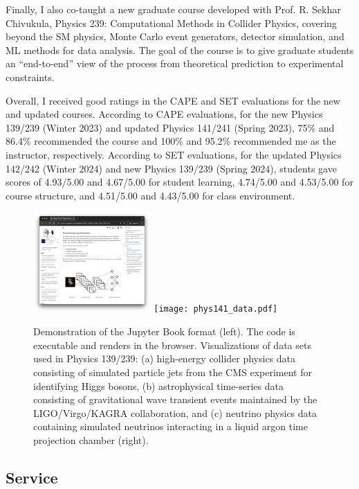 \documentclass[11pt,letterpaper,notitlepage]{article}
\begin{document}
Finally, I also co-taught a new graduate course developed with Prof. R. Sekhar Chivukula, Physics 239: Computational Methods in Collider Physics, covering beyond the SM physics, Monte Carlo event generators, detector simulation, and ML methods for data analysis.
The goal of the course is to give graduate students an ``end-to-end'' view of the process from theoretical prediction to experimental constraints.


Overall, I received good ratings in the CAPE and SET evaluations for the new and updated courses.
According to CAPE evaluations, for the new Physics 139/239 (Winter 2023) and updated Physics 141/241 (Spring 2023), 75\% and 86.4\% recommended the course and 100\% and 95.2\% recommended me as the instructor, respectively.
According to SET evaluations, for the updated Physics 142/242 (Winter 2024) and new Physics 139/239 (Spring 2024), students gave scores of 4.93/5.00 and 4.67/5.00 for student learning, 4.74/5.00 and 4.53/5.00 for course structure, and 4.51/5.00 and 4.43/5.00 for class environment.


\begin{figure}[htb]
    \centering
    \includegraphics[width=0.4\textwidth]{jupyterbook.png}
    \texttt{[image: phys141\_data.pdf]}
    \caption{Demonstration of the Jupyter Book format (left).
        The code is executable and renders in the browser.
        Visualizations of data sets used in Physics 139/239: (a) high-energy collider physics data consisting of simulated particle jets from the CMS experiment for identifying Higgs bosons, (b) astrophysical time-series data consisting of gravitational wave transient events maintained by the LIGO/Virgo/KAGRA collaboration, and (c) neutrino physics data containing simulated neutrinos interacting in a liquid argon time projection chamber (right).
        \label{fig:teaching}}
\end{figure}

\vspace{-1ex}
\subsection*{Service}
\end{document}
